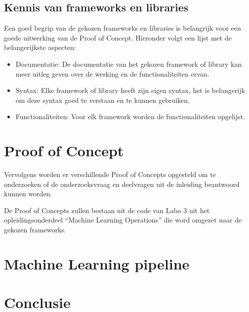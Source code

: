 \subsection{Kennis van frameworks en libraries}
Een goed begrip van de gekozen frameworks en libraries is belangrijk voor een goede uitwerking van de Proof of Concept. Hieronder volgt een lijst met de belangerijkste aspecten:
\begin{itemize}
  \item Documentatie: De documentatie van het gekozen framework of library kan meer uitleg geven over de werking en de functionaliteiten ervan.
  \item Syntax: Elke framework of library heeft zijn eigen syntax, het is belangerijk om deze syntax goed te verstaan en te kunnen gebruiken.
  \item Functionaliteiten: Voor elk framework worden de functionaliteiten opgelijst.
\end{itemize}
\section{Proof of Concept}
Vervolgens worden er verschillende Proof of Concepts opgesteld om te onderzoeken of de onderzoeksvraag en deelvragen uit de inleiding beantwoord kunnen worden.

De Proof of Concepts zullen bestaan uit de code van Labo 3 uit het opleidingsonderdeel ``Machine Learning Operations'' die word omgezet naar de gekozen frameworks.

\section{Machine Learning pipeline}
\section{Conclusie}

